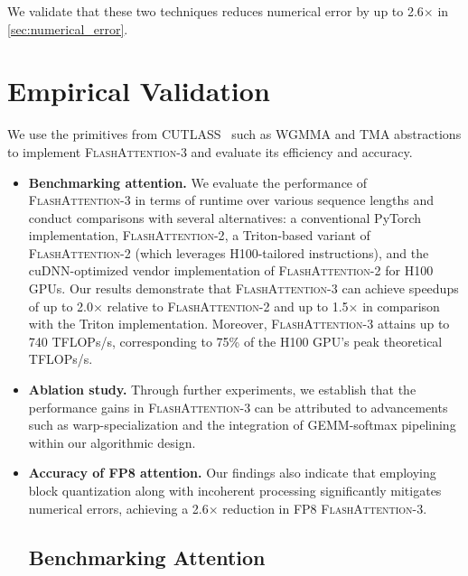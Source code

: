 \begin{enumerate}
\begin{algorithm}[H]
\begin{algorithmic}[1]
We validate that these two techniques reduces numerical error by up to 2.6$\times$ in \cref{sec:numerical_error}.

\section{Empirical Validation}
\label{sec:exp}

We use the primitives from CUTLASS~\citep{Thakkar_CUTLASS_2023} such as WGMMA and TMA abstractions to implement \textsc{FlashAttention-3} and evaluate its efficiency and accuracy.

\begin{itemize}

\item \textbf{Benchmarking attention.} We evaluate the performance of \textsc{FlashAttention-3} in terms of runtime over various sequence lengths and conduct comparisons with several alternatives: a conventional PyTorch implementation, \textsc{FlashAttention-2}, a Triton-based variant of \textsc{FlashAttention-2} (which leverages H100-tailored instructions), and the cuDNN-optimized vendor implementation of \textsc{FlashAttention-2} for H100 GPUs. Our results demonstrate that \textsc{FlashAttention-3} can achieve speedups of up to 2.0$\times$ relative to \textsc{FlashAttention-2} and up to 1.5$\times$ in comparison with the Triton implementation. Moreover, \textsc{FlashAttention-3} attains up to 740 TFLOPs/s, corresponding to 75\% of the H100 GPU's peak theoretical TFLOPs/s.
\item \textbf{Ablation study.} Through further experiments, we establish that the performance gains in \textsc{FlashAttention-3} can be attributed to advancements such as warp-specialization and the integration of GEMM-softmax pipelining within our algorithmic design.
\item \textbf{Accuracy of FP8 attention.} Our findings also indicate that employing block quantization along with incoherent processing significantly mitigates numerical errors, achieving a 2.6$\times$ reduction in FP8 \textsc{FlashAttention-3}.

\subsection{Benchmarking Attention}
\label{subsec:benchmark_attn}


\end{itemize}
\end{algorithmic}
\end{algorithm}
\end{enumerate}
